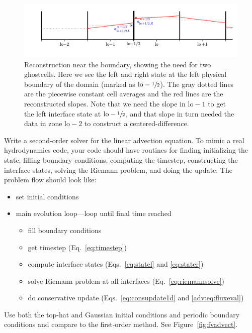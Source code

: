 \begin{figure}[t]
\centering
\includegraphics[width=\linewidth]{riemann-bc}
\caption[Reconstruction at the domain boundary]
        {\label{fig:advect_ghost} Reconstruction near the boundary,
          showing the need for two ghostcells.  Here we see the left
          and right state at the left physical boundary of the domain
          (marked as $\mathrm{lo}-{\sfrac{1}{2}}$).  The gray dotted lines
          are the piecewise constant cell averages and the red lines
          are the reconstructed slopes.  Note that we need the slope
          in $\mathrm{lo}-1$ to get the left interface state at
          $\mathrm{lo}-{\sfrac{1}{2}}$, and that slope in turn needed the
          data in zone $\mathrm{lo}-2$ to construct a
          centered-difference.}
\end{figure}


\begin{exercise}
{\label{adv:ex:fv} Write a second-order solver for the linear advection
  equation.  To mimic a real hydrodynamics code, your code should have
  routines for finding initializing the state, filling boundary conditions,
  computing the timestep,
  constructing the interface states, solving the Riemann problem, and
  doing the update.  The problem flow should look like:
  \begin{itemize}
    \item set initial conditions
    \item main evolution loop---loop until final time reached
    \begin{itemize}
      \item fill boundary conditions
      \item get timestep (Eq.~\ref{eq:timestep})
      \item compute interface states (Eqs.~\ref{eq:statel} and \ref{eq:stater})
      \item solve Riemann problem at all interfaces (Eq.~\ref{eq:riemannsolve})
      \item do conservative update (Eqs.~\ref{eq:consupdate1d} and \ref{adv:eq:fluxeval})
    \end{itemize}
  \end{itemize}
Use both the top-hat and Gaussian initial conditions and periodic boundary
conditions and compare to the first-order method.  See Figure~\ref{fig:fvadvect}.
}
\end{exercise}

